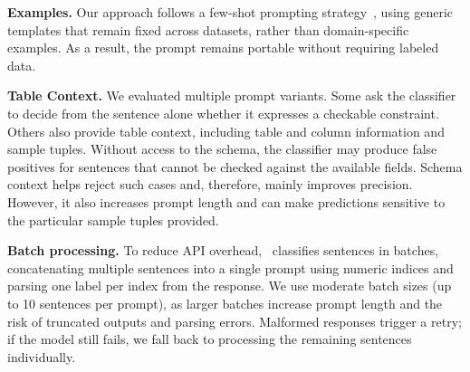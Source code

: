 \smallskip\noindent\textbf{Examples.} Our approach follows a  few-shot prompting strategy~\cite{brown2020language}, using generic templates that remain fixed across datasets, rather than domain-specific examples. As a result, the prompt remains portable without requiring labeled data.




\smallskip\noindent\textbf{Table Context.}
We evaluated multiple prompt variants. 
Some ask the classifier to decide from the sentence alone whether it expresses a checkable constraint.
Others also provide table context, including table and column information and sample tuples. Without access to the schema, the classifier may
produce false positives for sentences that cannot be checked against the
available fields. Schema context helps reject such cases and, therefore, mainly improves precision. 
However, it also increases prompt length and can make predictions sensitive to the particular sample tuples provided.

\smallskip\noindent\textbf{Batch processing.}
To reduce API overhead, \system\ classifies sentences in batches, concatenating 
multiple sentences into a single prompt using numeric indices and parsing one 
label per index from the response. We use moderate batch sizes (up to 10 sentences 
per prompt), as larger batches increase prompt length and the risk of truncated 
outputs and parsing errors. Malformed responses trigger a retry; if the model 
still fails, we fall back to processing the remaining sentences individually.












